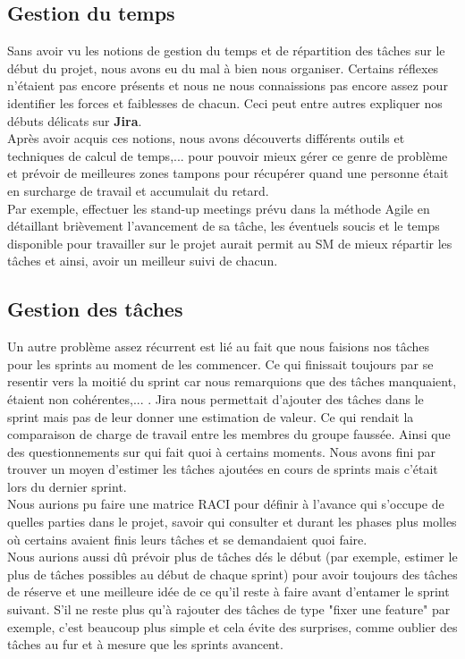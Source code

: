 \documentclass[t, 12pt, usenames,dvipsnames]{article}
\begin{document}
     \subsection{Gestion du temps}
     \noindent Sans avoir vu les notions de gestion du temps et de répartition des tâches sur le début du projet, nous avons eu du mal à bien nous organiser. Certains réflexes n'étaient pas encore présents et nous ne nous connaissions pas encore assez pour identifier les forces et faiblesses de chacun. Ceci peut entre autres expliquer nos débuts délicats sur \textbf{Jira}. \\
     Après avoir acquis ces notions, nous avons découverts différents outils et techniques de calcul de temps,... pour pouvoir mieux gérer ce genre de problème et prévoir de meilleures zones tampons pour récupérer quand une personne était en surcharge de travail et accumulait du retard.
     \\Par exemple, effectuer les stand-up meetings prévu dans la méthode Agile en détaillant brièvement l'avancement de sa tâche, les éventuels soucis et le temps disponible pour travailler sur le projet aurait permit au SM de mieux répartir les tâches et ainsi, avoir un meilleur suivi de chacun.
     
     \subsection{Gestion des tâches}
     \noindent Un autre problème assez récurrent est lié au fait que nous faisions nos tâches pour les sprints au moment de les commencer. Ce qui finissait toujours par se resentir vers la moitié du sprint car nous remarquions que des tâches manquaient, étaient non cohérentes,... . Jira nous permettait d'ajouter des tâches dans le sprint mais pas de leur donner une estimation de valeur. Ce qui rendait la comparaison de charge de travail entre les membres du groupe faussée. Ainsi que des questionnements sur qui fait quoi à certains moments. Nous avons fini par trouver un moyen d'estimer les tâches ajoutées en cours de sprints mais c'était lors du dernier sprint.
     \\ Nous aurions pu faire une matrice RACI pour définir à l'avance qui s'occupe de quelles parties dans le projet, savoir qui consulter et durant les phases plus molles où certains avaient finis leurs tâches et se demandaient quoi faire. \\
     Nous aurions aussi dû prévoir plus de tâches dés le début (par exemple, estimer le plus de tâches possibles au début de chaque sprint) pour avoir toujours des tâches de réserve et une meilleure idée de ce qu'il reste à faire avant d'entamer le sprint suivant. S'il ne reste plus qu'à rajouter des tâches de type "fixer une feature" par exemple, c'est beaucoup plus simple et cela évite des surprises, comme oublier des tâches au fur et à mesure que les sprints avancent.
     
\end{document}
